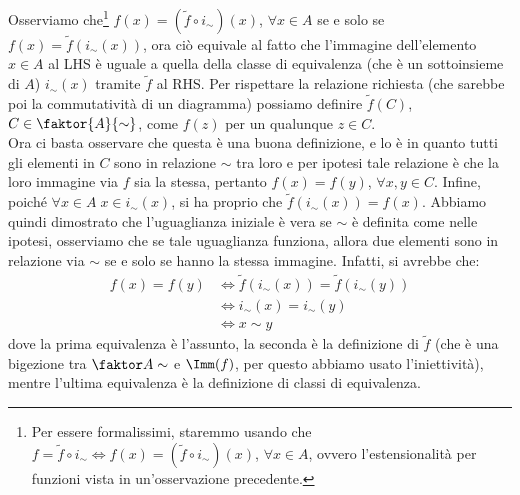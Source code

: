 \documentclass[11pt]{scrartcl}
\begin{document}
\begin{soln}
	Osserviamo che\footnote{Per essere formalissimi, staremmo usando che $f = \widetilde{f} \circ i_\sim \iff f(x) = (\widetilde{f} \circ i_\sim)(x)$, $\forall x \in A$, ovvero
	l'estensionalità per funzioni vista in un'osservazione precedente.} $f(x) = (\widetilde{f} \circ i_\sim)(x)$, $\forall x \in A$ se e solo se $f(x) = \widetilde{f}(i_\sim(x))$, ora ciò equivale al fatto che 
	l'immagine dell'elemento $x \in A$ al LHS è uguale a quella della classe di equivalenza (che è un sottoinsieme di $A$) $i_\sim(x)$ tramite $\widetilde{f}$ al RHS. Per rispettare la relazione richiesta (che sarebbe poi la commutatività di un diagramma)
	possiamo definire $\widetilde{f}(C)$, $C \in \faktor{A}{\sim}$, come $f(z)$ per un qualunque $z \in C$.\\ Ora ci basta osservare che questa è una buona definizione, e lo è in quanto tutti gli elementi in $C$ sono in relazione $\sim$ tra loro e per ipotesi tale relazione 
	è che la loro immagine via $f$ sia la stessa, pertanto $f(x) = f(y)$, $\forall x,y \in C$. Infine, poiché $\forall x \in A \; x \in i_\sim(x)$, si ha proprio che $\widetilde{f}(i_\sim(x)) = f(x)$. Abbiamo quindi dimostrato che l'uguaglianza iniziale è vera 
	se $\sim$ è definita come nelle ipotesi, osserviamo che se tale uguaglianza funziona, allora due elementi sono in relazione via $\sim$ se e solo se hanno la stessa immagine. Infatti, si avrebbe che:
	\[ \begin{split}
		f(x) = f(y) &\iff \widetilde{f}(i_\sim(x)) = \widetilde{f}(i_\sim(y)) \\
					&\iff i_\sim(x) = i_\sim(y) \\
					&\iff x \sim y
	\end{split}
		\]
	dove la prima equivalenza è l'assunto, la seconda è la definizione di $\widetilde{f}$ (che è una bigezione tra $\faktor A\sim$ e $\Imm(f)$, per questo abbiamo usato l'iniettività), mentre l'ultima equivalenza è la definizione di classi di equivalenza.
\end{soln}

\newpage
\end{document}
